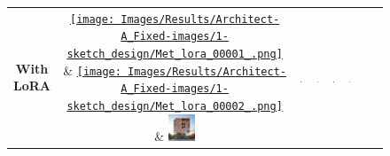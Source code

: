 \begin{figure}[H]
{\begin{tabular}{c c c c c c c c}
    \shortstack{\textbf{With}\\\textbf{LoRA}} & \href{https://github.com/matijspeeters/Thesis_Lora/blob/main/Results/Architect%20A/Sketch%20design/Met_lora_00001_.png}{\texttt{[image: Images/Results/Architect-A\_Fixed-images/1-sketch\_design/Met\_lora\_00001\_.png]}} & \href{https://github.com/matijspeeters/Thesis_Lora/blob/main/Results/Architect%20A/Sketch%20design/Met_lora_00002_.png}{\texttt{[image: Images/Results/Architect-A\_Fixed-images/1-sketch\_design/Met\_lora\_00002\_.png]}} &
    \includegraphics[width=0.12\textwidth]{Images/Results/Architect-A_Fixed-images/1-sketch_design/Met_lora_00017_ (2).png} &
    \includegraphics[width=0.12\textwidth]{Images/Results/Architect-A_Fixed-images/1-sketch_design/Met_lora_00029_.png} &
    \includegraphics[width=0.12\textwidth]{Images/Results/Architect-A_Fixed-images/1-sketch_design/Met_lora_00039_.png} &
    \includegraphics[width=0.12\textwidth]{Images/Results/Architect-A_Fixed-images/1-sketch_design/Met_lora_00043_ (1).png} &
    \includegraphics[width=0.12\textwidth]{Images/Results/Architect-A_Fixed-images/1-sketch_design/Met_lora_00058_.png} \\


\end{tabular}}
\end{figure}
